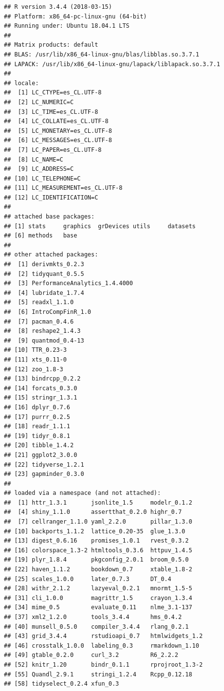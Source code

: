 \documentclass[12pt,]{book}
\begin{document}
\begin{verbatim}
## R version 3.4.4 (2018-03-15)
## Platform: x86_64-pc-linux-gnu (64-bit)
## Running under: Ubuntu 18.04.1 LTS
## 
## Matrix products: default
## BLAS: /usr/lib/x86_64-linux-gnu/blas/libblas.so.3.7.1
## LAPACK: /usr/lib/x86_64-linux-gnu/lapack/liblapack.so.3.7.1
## 
## locale:
##  [1] LC_CTYPE=es_CL.UTF-8      
##  [2] LC_NUMERIC=C              
##  [3] LC_TIME=es_CL.UTF-8       
##  [4] LC_COLLATE=es_CL.UTF-8    
##  [5] LC_MONETARY=es_CL.UTF-8   
##  [6] LC_MESSAGES=es_CL.UTF-8   
##  [7] LC_PAPER=es_CL.UTF-8      
##  [8] LC_NAME=C                 
##  [9] LC_ADDRESS=C              
## [10] LC_TELEPHONE=C            
## [11] LC_MEASUREMENT=es_CL.UTF-8
## [12] LC_IDENTIFICATION=C       
## 
## attached base packages:
## [1] stats     graphics  grDevices utils     datasets 
## [6] methods   base     
## 
## other attached packages:
##  [1] derivmkts_0.2.3              
##  [2] tidyquant_0.5.5              
##  [3] PerformanceAnalytics_1.4.4000
##  [4] lubridate_1.7.4              
##  [5] readxl_1.1.0                 
##  [6] IntroCompFinR_1.0            
##  [7] pacman_0.4.6                 
##  [8] reshape2_1.4.3               
##  [9] quantmod_0.4-13              
## [10] TTR_0.23-3                   
## [11] xts_0.11-0                   
## [12] zoo_1.8-3                    
## [13] bindrcpp_0.2.2               
## [14] forcats_0.3.0                
## [15] stringr_1.3.1                
## [16] dplyr_0.7.6                  
## [17] purrr_0.2.5                  
## [18] readr_1.1.1                  
## [19] tidyr_0.8.1                  
## [20] tibble_1.4.2                 
## [21] ggplot2_3.0.0                
## [22] tidyverse_1.2.1              
## [23] gapminder_0.3.0              
## 
## loaded via a namespace (and not attached):
##  [1] httr_1.3.1       jsonlite_1.5     modelr_0.1.2    
##  [4] shiny_1.1.0      assertthat_0.2.0 highr_0.7       
##  [7] cellranger_1.1.0 yaml_2.2.0       pillar_1.3.0    
## [10] backports_1.1.2  lattice_0.20-35  glue_1.3.0      
## [13] digest_0.6.16    promises_1.0.1   rvest_0.3.2     
## [16] colorspace_1.3-2 htmltools_0.3.6  httpuv_1.4.5    
## [19] plyr_1.8.4       pkgconfig_2.0.1  broom_0.5.0     
## [22] haven_1.1.2      bookdown_0.7     xtable_1.8-2    
## [25] scales_1.0.0     later_0.7.3      DT_0.4          
## [28] withr_2.1.2      lazyeval_0.2.1   mnormt_1.5-5    
## [31] cli_1.0.0        magrittr_1.5     crayon_1.3.4    
## [34] mime_0.5         evaluate_0.11    nlme_3.1-137    
## [37] xml2_1.2.0       tools_3.4.4      hms_0.4.2       
## [40] munsell_0.5.0    compiler_3.4.4   rlang_0.2.1     
## [43] grid_3.4.4       rstudioapi_0.7   htmlwidgets_1.2 
## [46] crosstalk_1.0.0  labeling_0.3     rmarkdown_1.10  
## [49] gtable_0.2.0     curl_3.2         R6_2.2.2        
## [52] knitr_1.20       bindr_0.1.1      rprojroot_1.3-2 
## [55] Quandl_2.9.1     stringi_1.2.4    Rcpp_0.12.18    
## [58] tidyselect_0.2.4 xfun_0.3
\end{verbatim}
\end{document}
